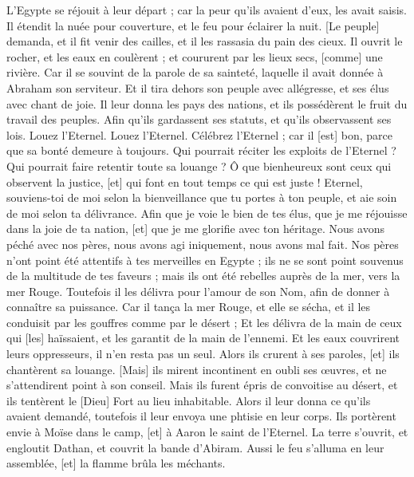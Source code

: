 \begin{multicols}{2}
L'Egypte se réjouit à leur départ ; car la peur qu'ils avaient d'eux, les avait saisis.
Il étendit la nuée pour couverture, et le feu pour éclairer la nuit.
[Le peuple] demanda, et il fit venir des cailles, et il les rassasia du pain des cieux.
Il ouvrit le rocher, et les eaux en coulèrent ; et coururent par les lieux secs, [comme] une rivière.
Car il se souvint de la parole de sa sainteté, laquelle il avait donnée à Abraham son serviteur.
Et il tira dehors son peuple avec allégresse, et ses élus avec chant de joie.
Il leur donna les pays des nations, et ils possédèrent le fruit du travail des peuples.
Afin qu'ils gardassent ses statuts, et qu'ils observassent ses lois. Louez l'Eternel.
\VerseOne{}Louez l'Eternel. Célébrez l'Eternel ; car il [est] bon, parce que sa bonté demeure à toujours.
Qui pourrait réciter les exploits de l'Eternel ? Qui pourrait faire retentir toute sa louange ?
Ô que bienheureux sont ceux qui observent la justice, [et] qui font en tout temps ce qui est juste !
Eternel, souviens-toi de moi selon la bienveillance que tu portes à ton peuple, et aie soin de moi selon ta délivrance.
Afin que je voie le bien de tes élus, que je me réjouisse dans la joie de ta nation, [et] que je me glorifie avec ton héritage.
Nous avons péché avec nos pères, nous avons agi iniquement, nous avons mal fait.
Nos pères n'ont point été attentifs à tes merveilles en Egypte ; ils ne se sont point souvenus de la multitude de tes faveurs ; mais ils ont été rebelles auprès de la mer, vers la mer Rouge.
Toutefois il les délivra pour l'amour de son Nom, afin de donner à connaître sa puissance.
Car il tança la mer Rouge, et elle se sécha, et il les conduisit par les gouffres comme par le désert ;
Et les délivra de la main de ceux qui [les] haïssaient, et les garantit de la main de l'ennemi.
Et les eaux couvrirent leurs oppresseurs, il n'en resta pas un seul.
Alors ils crurent à ses paroles, [et] ils chantèrent sa louange.
[Mais] ils mirent incontinent en oubli ses œuvres, et ne s'attendirent point à son conseil.
Mais ils furent épris de convoitise au désert, et ils tentèrent le [Dieu] Fort au lieu inhabitable.
Alors il leur donna ce qu'ils avaient demandé, toutefois il leur envoya une phtisie en leur corps.
Ils portèrent envie à Moïse dans le camp, [et] à Aaron le saint de l'Eternel.
La terre s'ouvrit, et engloutit Dathan, et couvrit la bande d'Abiram.
Aussi le feu s'alluma en leur assemblée, [et] la flamme brûla les méchants.

\end{multicols}

